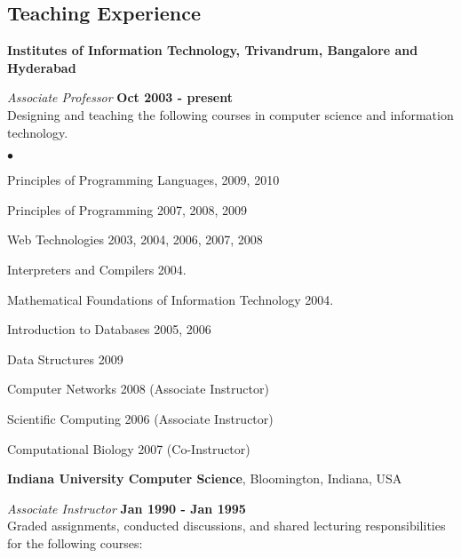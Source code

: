 \documentclass[11pt,margin,line]{res}
\newenvironment{list2}{
  \begin{list}{$\bullet$}{%
      \setlength{\itemsep}{0in}
      \setlength{\parsep}{0in} \setlength{\parskip}{0in}
      \setlength{\topsep}{0in} \setlength{\partopsep}{0in} 
      \setlength{\leftmargin}{0.2in}}}{\end{list}}
\begin{document}
\begin{resume}
\vspace{3em}

\section{\sc Teaching Experience}

{\bf Institutes of Information Technology, Trivandrum, Bangalore and Hyderabad}
\vspace{-.5cm}

{\em Associate Professor} \hfill {\bf Oct 2003 - present}\\
Designing and teaching the following courses in computer
science and information technology.

\vspace*{1em}

\begin{list2}
\item Principles of Programming Languages, 2009, 2010
\item Principles of Programming  2007, 2008, 2009
\item Web Technologies  2003, 2004, 2006, 2007, 2008
\item Interpreters and Compilers 2004.
\item Mathematical Foundations of Information Technology 2004.
\item Introduction to Databases 2005, 2006
\item Data Structures 2009
\item Computer Networks  2008 (Associate Instructor)
\item Scientific Computing 2006 (Associate Instructor)
\item Computational Biology 2007 (Co-Instructor)
\end{list2}


{\bf Indiana University Computer Science},
Bloomington, Indiana, USA

\vspace{-.5cm}

{\em Associate Instructor} \hfill {\bf Jan 1990 - Jan 1995}\\
Graded assignments, conducted discussions, and
shared lecturing responsibilities for the following courses:


\end{resume}
\end{document}
